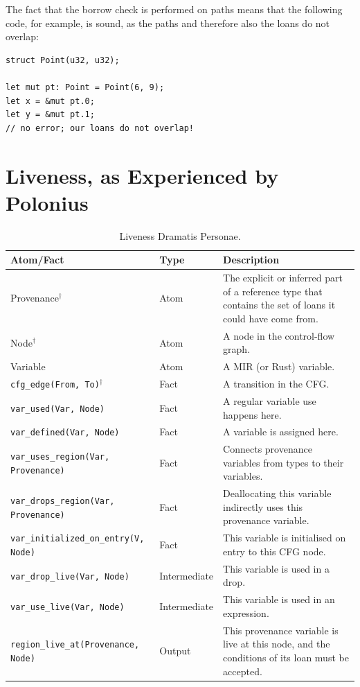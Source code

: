 \documentclass[11pt,a4paper,twoside,openany]{report}
\newcommand{\notmine}[0] {$^\dagger$}
\newcommand{\InDatalog}[1]{\texttt{#1}}
\begin{document}
The fact that the borrow check is performed on paths means that the following
code, for example, is sound, as the paths and therefore also the loans do not
overlap:
\begin{verbatim}
struct Point(u32, u32);

let mut pt: Point = Point(6, 9);
let x = &mut pt.0;
let y = &mut pt.1;
// no error; our loans do not overlap!
\end{verbatim}

\section{Liveness, as Experienced by Polonius}\label{sec:liveness}

{ \renewcommand{\arraystretch}{1.0}
\begin{table}[!htbp]
  \begin{tabular}{@{}l l m{5.5cm}}
    Atom/Fact & Type & Description \\ \toprule
    Provenance\notmine{} & Atom & The explicit or inferred part of a reference type that contains the set of loans it could have come from.  \\
    Node\notmine{} & Atom & A node in the control-flow graph. \\
    Variable & Atom & A MIR (or Rust) variable. \\
    \InDatalog{cfg_edge(From, To)}\notmine{} & Fact & A transition in the CFG\@. \\
    \InDatalog{var_used(Var, Node)} & Fact & A regular variable use happens here.\\
    \InDatalog{var_defined(Var, Node)} & Fact & A variable is assigned here.\\
    \InDatalog{var_uses_region(Var, Provenance)} & Fact & Connects provenance variables from types to their variables.\\
    \InDatalog{var_drops_region(Var, Provenance)} & Fact & Deallocating this variable indirectly uses this provenance variable. \\
    \InDatalog{var_initialized_on_entry(V, Node)} & Fact & This variable is initialised on entry to this CFG node. \\
    \InDatalog{var_drop_live(Var, Node)} & Intermediate & This variable is used in a drop. \\
    \InDatalog{var_use_live(Var, Node)} & Intermediate & This variable is used in an expression. \\
    \InDatalog{region_live_at(Provenance, Node)} & Output & This provenance variable is live at this node, and the conditions of its loan must be accepted. \\
  \end{tabular}
\caption[Liveness Dramatis Personae]{Liveness Dramatis Personae.}\label{tab:liveness-facts-recap}
\end{table}%
}
\end{document}
